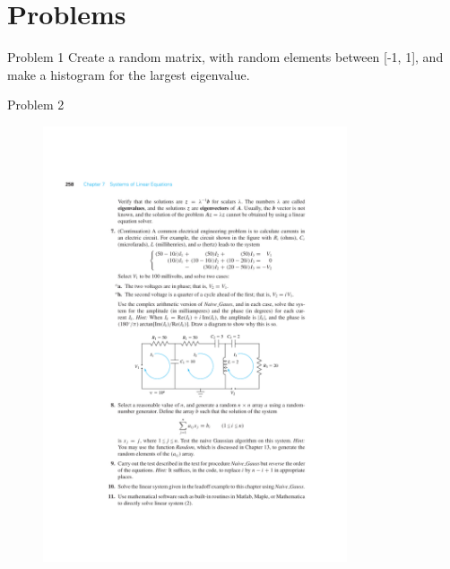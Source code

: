 \documentclass[xcolor=svgnames,t,10pt,allowframebreaks]{beamer}
\begin{document}
\section{Problems}
\label{sec:orgf9c5e7b}
\begin{frame}[label={sec:orgf410e4a}]{Problem 1}
\vfill
Create a random matrix, with random elements between [-1, 1], and
make a histogram for the largest eigenvalue.
\vfill
\end{frame}
\begin{frame}[label={sec:org9e7710c}]{Problem 2 \cite{cheney2012numerical}}
\begin{figure}[H]

\includegraphics[width=0.8\textwidth]{fig/problem-01.pdf}
\end{figure}
\end{frame}
\end{document}

